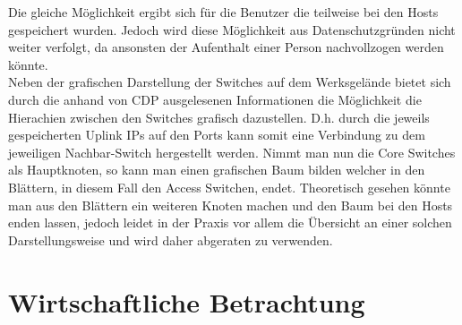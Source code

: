 Die gleiche Möglichkeit ergibt sich für die Benutzer die teilweise bei den Hosts gespeichert wurden. Jedoch wird diese Möglichkeit aus Datenschutzgründen nicht weiter verfolgt, da ansonsten der Aufenthalt einer Person nachvollzogen werden könnte.\\
Neben der grafischen Darstellung der Switches auf dem Werksgelände bietet sich durch die anhand von CDP ausgelesenen Informationen die Möglichkeit die Hierachien zwischen den Switches grafisch dazustellen. D.h. durch die jeweils gespeicherten Uplink IPs auf den Ports kann somit eine Verbindung zu dem jeweiligen Nachbar-Switch hergestellt werden. Nimmt man nun die Core Switches als Hauptknoten, so kann man einen grafischen Baum bilden welcher in den Blättern, in diesem Fall den Access Switchen, endet. Theoretisch gesehen könnte man aus den Blättern ein weiteren Knoten machen und den Baum bei den Hosts enden lassen, jedoch leidet in der Praxis vor allem die Übersicht an einer solchen Darstellungsweise und wird daher abgeraten zu verwenden.

\section{Wirtschaftliche Betrachtung}
\label{sec:economicloverview}

